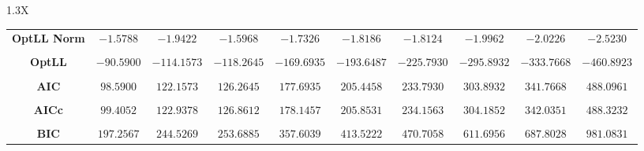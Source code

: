 \documentclass[10pt]{article}
\begin{document}
{\begin{tabularx}{1.3\textwidth}{X}
{\begin{tabular}{cccccccccc}
\cmidrule(r){1-10} \\
 { {\bf OptLL Norm} }& $-1.5788$ & $-1.9422$ & $-1.5968$ & $-1.7326$ & $-1.8186$ & $-1.8124$ & $-1.9962$& $-2.0226$& $-2.5230$ \\
\cmidrule(r){1-10} \\
 { {\bf OptLL} }& $-90.5900$ & $-114.1573$ & $-118.2645$ & $-169.6935$ & $-193.6487$ & $-225.7930$ & $-295.8932$& $-333.7668$& $-460.8923$ \\
\cmidrule(r){1-10} \\
 { {\bf AIC} }& $98.5900$ & $122.1573$ & $126.2645$ & $177.6935$ & $205.4458$ & $233.7930$ & $303.8932$& $341.7668$& $488.0961$ \\
\cmidrule(r){1-10} \\
 { {\bf AICc} }& $99.4052$ & $122.9378$ & $126.8612$ & $178.1457$ & $205.8531$ & $234.1563$ & $304.1852$& $342.0351$& $488.3232$ \\
\cmidrule(r){1-10} \\
 { {\bf BIC} }& $197.2567$ & $244.5269$ & $253.6885$ & $357.6039$ & $413.5222$ & $470.7058$ & $611.6956$& $687.8028$& $981.0831$ \\
\bottomrule
\end{tabular}}
\end{tabularx}}

  \vspace{3 cm}

  
\end{document}
